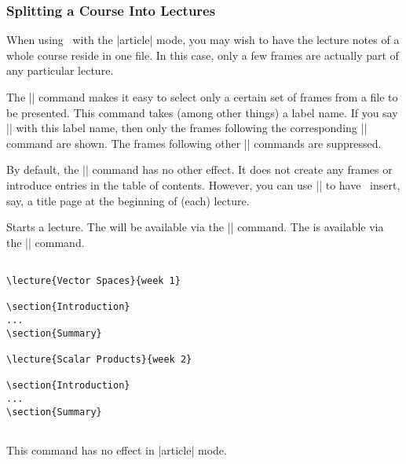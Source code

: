 \subsubsection{Splitting a Course Into Lectures}

When using \beamer\ with the |article| mode, you may wish to have the
lecture notes of a whole course reside in one file. In this case, only
a few frames are actually part of any particular lecture.

The |\lecture| command makes it easy to select only a certain set of
frames from a file to be presented. This command takes (among other
things) a label name. If you say || with this label
name, then only the frames following the corresponding |\lecture|
command are shown. The frames following other |\lecture| commands are
suppressed. 

By default, the |\lecture| command has no other effect. It does not
create any frames or introduce entries in the table of
contents. However, you can use |\AtBeginLecture| to have \beamer\
insert, say, a title page at the beginning of (each) lecture.

\begin{command}{\lecture{}} 
  Starts a lecture. The  will be available via the
  |\insertlecture| command. The \meta{short lecture name} is available
  via the |\insertshortlecture| command.
  
  \example
\begin{verbatim}

\lecture{Vector Spaces}{week 1}

\section{Introduction}
...
\section{Summary}

\lecture{Scalar Products}{week 2}

\section{Introduction}
...
\section{Summary}


\end{verbatim}

  \articlenote
  This command has no effect in |article| mode.
\end{command}

